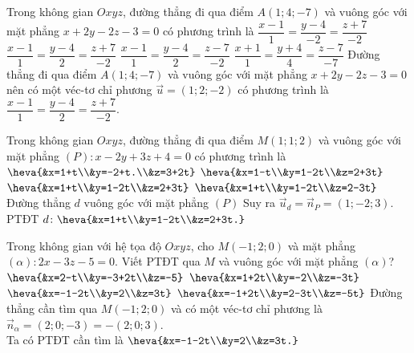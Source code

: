 \begin{ex}%
	Trong không gian $O x y z$, đường thẳng đi qua điểm $A(1;4;-7)$ và vuông góc với mặt phẳng $x+2y-2z-3=0$ có phương trình là 
	\choice 
	{$\dfrac{x-1}{1}=\dfrac{y-4}{-2}=\dfrac{z+7}{-2}$}
	{\True $\dfrac{x-1}{1}=\dfrac{y-4}{2}=\dfrac{z+7}{-2}$}
	{$\dfrac{x-1}{1}=\dfrac{y-4}{2}=\dfrac{z-7}{-2}$}
	{$\dfrac{x+1}{1}=\dfrac{y+4}{4}=\dfrac{z-7}{-7}$}
	\loigiai 
	{
Đường thẳng đi qua điểm $A(1;4;-7)$ và vuông góc với mặt phẳng $x+2y-2z-3=0$ nên có một véc-tơ chỉ phương $\vec{u}=(1;2;-2)$ có phương trình là $\dfrac{x-1}{1}=\dfrac{y-4}{2}=\dfrac{z+7}{-2}$.
	}
\end{ex}

\begin{ex}%
	Trong không gian $O x y z$, đường thẳng đi qua điểm $M(1;1;2)$ và vuông góc với mặt phẳng $(P)\colon x-2y+3z+4=0$ có phương trình là 
	\choice 
	{$\heva{&x=1+t\\&y=-2+t.\\&z=3+2t}$}
		{$\heva{&x=1-t\\&y=1-2t\\&z=2+3t}$}
			{\True $\heva{&x=1+t\\&y=1-2t\\&z=2+3t}$}
				{$\heva{&x=1+t\\&y=1-2t\\&z=2-3t}$}
					\loigiai 
					{
	Đường thẳng $d$ vuông góc với mặt phẳng $(P)$ Suy ra $\vec{u}_d=\vec{n}_P=(1;-2;3)$.\\
	PTĐT $d\colon \heva{&x=1+t\\&y=1-2t\\&z=2+3t.}$
					}
				\end{ex}
	
\begin{ex}%
	Trong không gian với hệ tọa độ $O x y z$, cho $M(-1;2;0)$ và mặt phẳng $(\alpha)\colon 2x-3z-5=0$. Viết PTĐT qua $M$ và vuông góc với mặt phẳng $(\alpha)$?
	\choice 
	{$\heva{&x=2-t\\&y=-3+2t\\&z=-5}$}
	{$\heva{&x=1+2t\\&y=-2\\&z=-3t}$}
	{\True $\heva{&x=-1-2t\\&y=2\\&z=3t}$}
	{$\heva{&x=-1+2t\\&y=2-3t\\&z=-5t}$}
		\loigiai 
	{
	Đường thẳng cần tìm qua $M(-1;2;0)$ và có một véc-tơ chỉ phương là $\vec{n}_{\alpha}=(2;0;-3)=-(2;0;3)$.\\
	Ta có PTĐT cần tìm là $\heva{&x=-1-2t\\&y=2\\&z=3t.}$
					}
				\end{ex}
			
